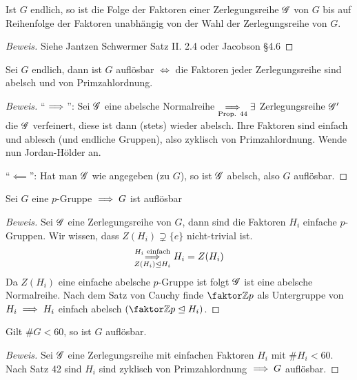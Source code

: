 \documentclass[a4paper]{report}
\begin{document}
\begin{satz}
Ist $G$ endlich, so ist die Folge der Faktoren einer Zerlegungsreihe $\mathscr{G}$ von $G$ bis auf Reihenfolge der Faktoren unabhängig von der Wahl der Zerlegungsreihe von $G$.
\end{satz}
\begin{proof}[Beweis] Siehe Jantzen Schwermer Satz II. 2.4 oder Jacobson §4.6
\end{proof}
\begin{kor} %
Sei $G$ endlich, dann ist $G$ auflösbar $\iff$ die Faktoren jeder Zerlegungsreihe sind abelsch und von Primzahlordnung.
\end{kor}
\begin{proof}[Beweis]
  \item ``$\implies$'': Sei $\mathscr{G}$ eine abelsche Normalreihe
  \(\underset{\text{Prop. 44}} {\implies} \exists \) Zerlegungsreihe $\mathscr{G}'$ die $\mathscr{G}$ verfeinert, diese ist dann (stets) wieder abelsch.
  Ihre Faktoren sind einfach und ablesch (und endliche Gruppen), also zyklisch von Primzahlordnung.
  Wende nun Jordan-Hölder an.
\item ``$\impliedby$'': Hat man $\mathscr{G}$ wie angegeben (zu $G$), so ist $\mathscr{G}$ abelsch, also $G$ auflösbar.
\end{proof}
\begin{bsp}
  Sei $G$ eine $p$-Gruppe $\implies G$ ist auflösbar
  \begin{proof}[Beweis]
    Sei $\mathscr{G}$ eine Zerlegungsreihe von $G$, dann sind die Faktoren $H_{i}$ einfache $p$-Gruppen. Wir wissen, dass $Z(H_{i}) \supsetneq \{e\}$ nicht-trivial ist.
    \[\overunderset{H_{i} \text{ einfach}}{Z(H_{i}) \nt H_{i}} \imp H_{i} = Z(H_{i})\]
    Da $Z(H_{i})$ eine einfache abelsche $p$-Gruppe ist folgt $\mathscr{G}$ ist eine abelsche Normalreihe. Nach dem Satz von Cauchy finde $\fak \Z p$ als Untergruppe von $H_{i} \implies H_{i}$ einfach abelsch $(\fak \Z p \nt H_{i})$.
  \end{proof}
\end{bsp}
\begin{bsp}
  Gilt $\#G < 60$, so ist $G$ auflösbar.
  \begin{proof}[Beweis]
    Sei $\mathscr{G}$ eine Zerlegungsreihe mit einfachen Faktoren $H_i$ mit $\#H_{i} < 60$. Nach Satz 42 sind $H_{i}$ sind zyklisch von Primzahlordnung $\implies G$ auflösbar.
  \end{proof}
\end{bsp}
\end{document}
